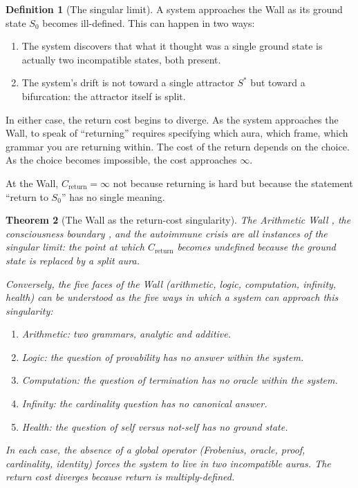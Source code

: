 \documentclass[12pt]{article}
\newtheorem{theorem}{Theorem}
\theoremstyle{definition}
\newtheorem{definition}[theorem]{Definition}
\theoremstyle{remark}
\begin{document}
\begin{definition}[The singular limit]
A system approaches the Wall as its ground state $S_0$ becomes ill-defined. This can happen in two ways:
\begin{enumerate}
\item The system discovers that what it thought was a single ground state is actually two incompatible states, both present.
\item The system's drift is not toward a single attractor $S^*$ but toward a bifurcation: the attractor itself is split.
\end{enumerate}
In either case, the return cost begins to diverge. As the system approaches the Wall, to speak of ``returning'' requires specifying which aura, which frame, which grammar you are returning within. The cost of the return depends on the choice. As the choice becomes impossible, the cost approaches $\infty$.

At the Wall, $C_{\text{return}}=\infty$ not because returning is hard but because the statement ``return to $S_0$'' has no single meaning.
\end{definition}

\begin{theorem}[The Wall as the return-cost singularity]
The Arithmetic Wall \cite{synthesis}, the consciousness boundary \cite{consciousness}, and the autoimmune crisis \cite{five} are all instances of the singular limit: the point at which $C_{\text{return}}$ becomes undefined because the ground state is replaced by a split aura.

Conversely, the five faces of the Wall (arithmetic, logic, computation, infinity, health) can be understood as the five ways in which a system can approach this singularity:
\begin{enumerate}
\item Arithmetic: two grammars, analytic and additive.
\item Logic: the question of provability has no answer within the system.
\item Computation: the question of termination has no oracle within the system.
\item Infinity: the cardinality question has no canonical answer.
\item Health: the question of self versus not-self has no ground state.
\end{enumerate}
In each case, the absence of a global operator (Frobenius, oracle, proof, cardinality, identity) forces the system to live in two incompatible auras. The return cost diverges because return is multiply-defined.
\end{theorem}
\end{document}
